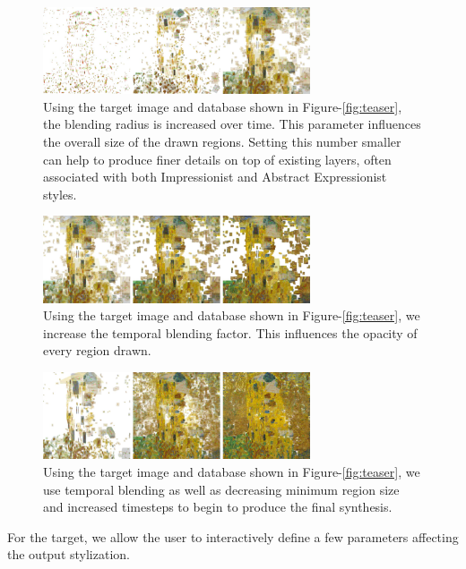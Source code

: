 \documentclass[a4paper,10pt,final]{ThesisStyle}
\begin{document}
\begin{figure}[ht]
  \centering
  \includegraphics[width=3.1in]{images/blending-radius-2.png}
  
  \caption{Using the target image and database shown in Figure-\ref{fig:teaser}, the blending radius is increased over time.  This parameter influences the overall size of the drawn regions.  Setting this number smaller can help to produce finer details on top of existing layers, often associated with both Impressionist and Abstract Expressionist styles.}
  \label{fig:blending-radius}
\end{figure}
\begin{figure}[ht]
  \centering
  \includegraphics[width=3.1in]{images/temporal-blending.png}
  
  \caption{Using the target image and database shown in Figure-\ref{fig:teaser}, we increase the temporal blending factor.  This influences the opacity of every region drawn. }
  \label{fig:temporal-blending}
\end{figure}
\begin{figure}[ht]
  \centering
  \includegraphics[width=3.1in]{images/temporal-blending-changing-params.png}
  
  \caption{Using the target image and database shown in Figure-\ref{fig:teaser}, we use temporal blending as well as decreasing minimum region size and increased timesteps to begin to produce the final synthesis.}
  \label{fig:temporal-blending-changing-parameters}
\end{figure}
For the target, we allow the user to interactively define a few parameters affecting the output stylization.  
\end{document}
